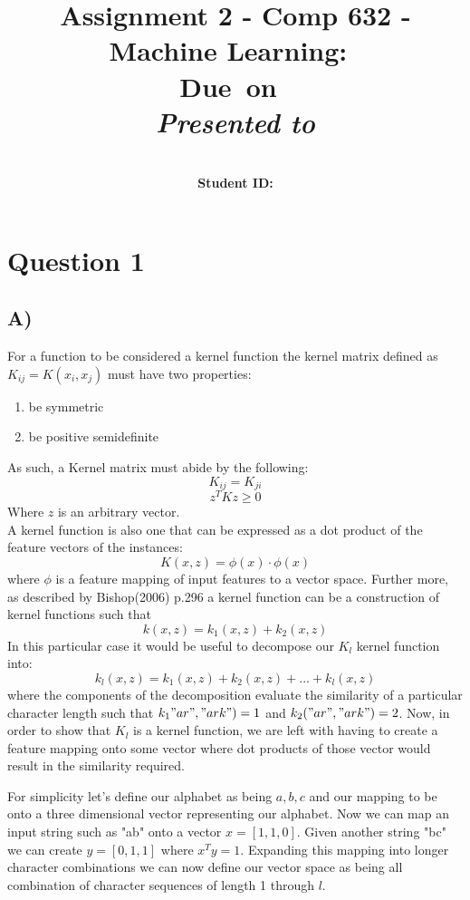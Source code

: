 \documentclass{report}
\title{Assignment 2 - Comp 632 - Machine Learning}
\title{\vspace{2in}\textmd{\textbf{\hmwkClass:\ \hmwkTitle}}\\
\normalsize\vspace{0.1in}\small{Due\ on\ \hmwkDueDate}\\
\vspace{0.1in}\large{\textit{Presented to \hmwkClassInstructor}}\vspace{3in}}
\date{}
\author{\textbf{\hmwkAuthorName}\\
    \textbf{Student ID: \hmwkAuthorNumber}}
\begin{document}
\maketitle
\section*{Question 1}
\subsection*{A)}
For a function to be considered a kernel function the kernel matrix defined as
$K_{ij}=K(x_i,x_j)$ must have two properties:
\begin{enumerate}
  \item be symmetric
  \item be positive semidefinite
\end{enumerate}
As such, a Kernel matrix must abide by the following:
\begin{equation}
  K_{ij} = K_{ji}
\end{equation}
\begin{equation}
  z^{T}Kz\geq 0
\end{equation}
Where $z$ is an arbitrary vector. \\

A kernel function is also one that can be expressed as a dot product of the feature
vectors of the instances:
\begin{equation}
  K(x,z) = \phi (x) \cdot \phi (x)
\end{equation}
where $\phi$ is a feature mapping of input features to a vector space. Further more,
as described by Bishop(2006) p.296 a kernel function can be a construction of kernel
functions such that
\begin{equation}
  k(x,z) = k_1(x,z) + k_2(x,z)
\end{equation}
In this particular case it would be useful to decompose our $K_l$ kernel function
into:
\begin{equation}
  k_l(x,z) = k_1(x,z) + k_2(x,z) + ... + k_l(x,z)
\end{equation}
where the components of the decomposition evaluate the similarity of a particular
character length such that $k_1"ar","ark")=1$ and $k_2("ar","ark")=2$. Now, in order
to show that $K_l$ is a kernel function, we are left with having to create a feature
mapping onto some vector where dot products of those vector would result in the
similarity required.

For simplicity let's define our alphabet as being ${a,b,c}$
and our mapping to be onto a three dimensional vector representing our alphabet.
Now we can map an input string such as "ab" onto a vector $x=[1,1,0]$. Given another
string "bc" we can create $y=[0,1,1]$ where $x^Ty=1$. Expanding this mapping into
longer character combinations we can now define our vector space as being all combination
of character sequences of length 1 through $l$.
\end{document}
